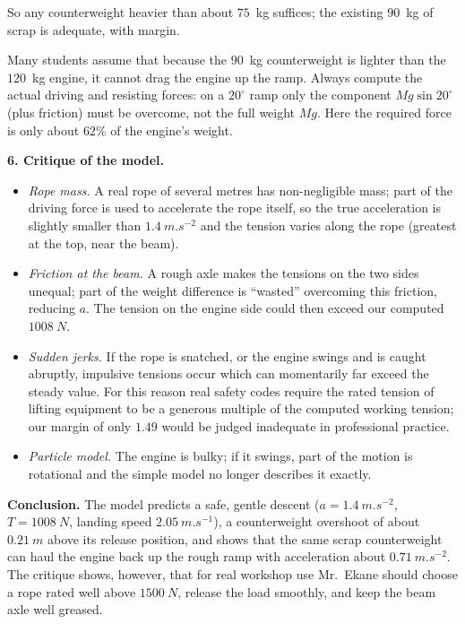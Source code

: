 \documentclass[11pt]{article}
\begin{document}
So any counterweight heavier than about $75$~kg suffices; the existing $90$~kg of scrap is adequate, with margin.

\begin{attention}
Many students assume that because the $90$~kg counterweight is lighter than the $120$~kg engine, it cannot drag the engine up the ramp. Always compute the actual driving and resisting forces: on a $20^\circ$ ramp only the component $Mg\sin 20^\circ$ (plus friction) must be overcome, not the full weight $Mg$. Here the required force is only about $62\%$ of the engine's weight.
\end{attention}

\textbf{6. Critique of the model.}

\begin{itemize}
\item \emph{Rope mass.} A real rope of several metres has non-negligible mass; part of the driving force is used to accelerate the rope itself, so the true acceleration is slightly smaller than $\SI{1.4}{m.s^{-2}}$ and the tension varies along the rope (greatest at the top, near the beam).
\item \emph{Friction at the beam.} A rough axle makes the tensions on the two sides unequal; part of the weight difference is ``wasted'' overcoming this friction, reducing $a$. The tension on the engine side could then exceed our computed $\SI{1008}{N}$.
\item \emph{Sudden jerks.} If the rope is snatched, or the engine swings and is caught abruptly, impulsive tensions occur which can momentarily far exceed the steady value. For this reason real safety codes require the rated tension of lifting equipment to be a generous multiple of the computed working tension; our margin of only $1.49$ would be judged inadequate in professional practice.
\item \emph{Particle model.} The engine is bulky; if it swings, part of the motion is rotational and the simple model no longer describes it exactly.
\end{itemize}

\textbf{Conclusion.} The model predicts a safe, gentle descent ($a = \SI{1.4}{m.s^{-2}}$, $T = \SI{1008}{N}$, landing speed $\SI{2.05}{m.s^{-1}}$), a counterweight overshoot of about $\SI{0.21}{m}$ above its release position, and shows that the same scrap counterweight can haul the engine back up the rough ramp with acceleration about $\SI{0.71}{m.s^{-2}}$. The critique shows, however, that for real workshop use Mr.~Ekane should choose a rope rated well above $\SI{1500}{N}$, release the load smoothly, and keep the beam axle well greased.
\end{document}
